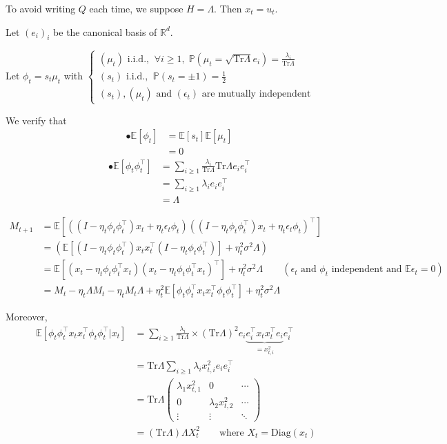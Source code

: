 \documentclass{article}
\newcommand{\R}{\mathbb{R}}
\renewcommand{\P}{\mathbb{P}}
\newcommand{\diag}{\mathrm{Diag}}
\newcommand{\E}{\mathbb{E}}
\newcommand{\tr}{\mathrm{Tr}}
\begin{document}
To avoid writing $Q$ each time, we suppose $H = \Lambda$. Then $x_t = u_t$.

Let $(e_i)_i$ be the canonical basis of $\R^d$.

Let $\phi_t = s_t  \mu_t$ with  
$\left\{\begin{array}{l}
(\mu_t) \text{ i.i.d., }~\forall i\geq 1, \;\P(\mu_t = \sqrt {\tr \Lambda}e_i) =  \frac{\lambda_i}{\tr\Lambda}\\
(s_t) \text{ i.i.d., }~\P(s_t=\pm 1) = \frac{1}{2}\\
(s_t), (\mu_t) \text{ and } (\epsilon_t) \text{ are mutually independent}
\end{array}\right.$

We verify that
\begin{align*}
\bullet \E[\phi_t] &= \E[s_t] \E[\mu_t]
\\&= 0
\end{align*}
\begin{align*}
\bullet \E[\phi_t \phi_t^\top]
&= 
\sum_{i \geq 1} \frac{\lambda_i}{\tr\Lambda} \tr \Lambda e_i e_i^\top
\\&=
\sum_{i \geq 1} \lambda_i e_i e_i^\top 
\\&=
\Lambda
\end{align*}



\begin{align*}
M_{t+1} &= \E[((I-\eta_t \phi_t \phi_t^\top)x_t + \eta_t \epsilon_t \phi_t)((I-\eta_t \phi_t \phi_t^\top)x_t + \eta_t \epsilon_t \phi_t)^\top] \\
&=  (\E[(I-\eta_t \phi_t \phi_t^\top)x_tx_t^\top (I-\eta_t \phi_t \phi_t^\top)]+\eta_t^2\sigma^2 \Lambda)\\
&=  \E[ (x_t-\eta_t\phi_t\phi_t^\top x_t)(x_t-\eta_t\phi_t\phi_t^\top x_t)^\top]  + \eta_t^2\sigma^2\Lambda \qquad (\text{$\epsilon_t$ and $\phi_t$ independent and $\E\epsilon_t =0$})\\
&= M_t - \eta_t \Lambda M_t - \eta_t M_t \Lambda + \eta_t^2  \E[\phi_t \phi_t^\top x_t x_t^\top \phi_t\phi_t^\top] + \eta_t^2\sigma^2\Lambda
\end{align*}

Moreover,
\begin{align*}
\E[\phi_t \phi_t^\top x_t x_t^\top \phi_t\phi_t^\top | x_t] 
&=
\sum_{i\geq1} \frac{\lambda_i}{\tr \Lambda} \times (\tr \Lambda)^2  e_i \underbrace{e_i^\top  x_t x_t^\top  e_i}_{=x_{t,i}^2} e_i^\top
\\&=
\tr \Lambda\sum_{i\geq1} \lambda_i x_{t,i}^2  e_i  e_i^\top
\\&=
\tr \Lambda
\begin{pmatrix}
\lambda_1 x_{t,1}^2 & 0                  & \cdots \\
0                  & \lambda_2 x_{t,2}^2 & \cdots \\
\vdots             & \vdots             & \ddots
\end{pmatrix}
\\&=
(\tr \Lambda) \Lambda X_t^2 \qquad \text{where $X_t=\diag(x_t)$ }
\end{align*}
\end{document}
